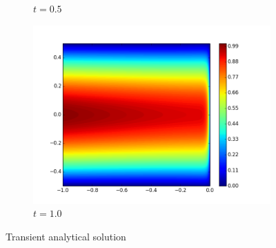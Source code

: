 \documentclass{article}
\begin{document}
\begin{figure}[ht]
\begin{subfigure}[t]{0.32\textwidth}
\caption{$t=0.5$}
\end{subfigure}
\begin{subfigure}[t]{0.32\textwidth}
\centering
\includegraphics[width=\textwidth]{Confusion/Robustness/2d_problem_t_=_10.png}
\caption{$t=1.0$}
\end{subfigure}
\caption{Transient analytical solution}
\label{fig:transientAnalytical}
\end{figure}

\end{document}
